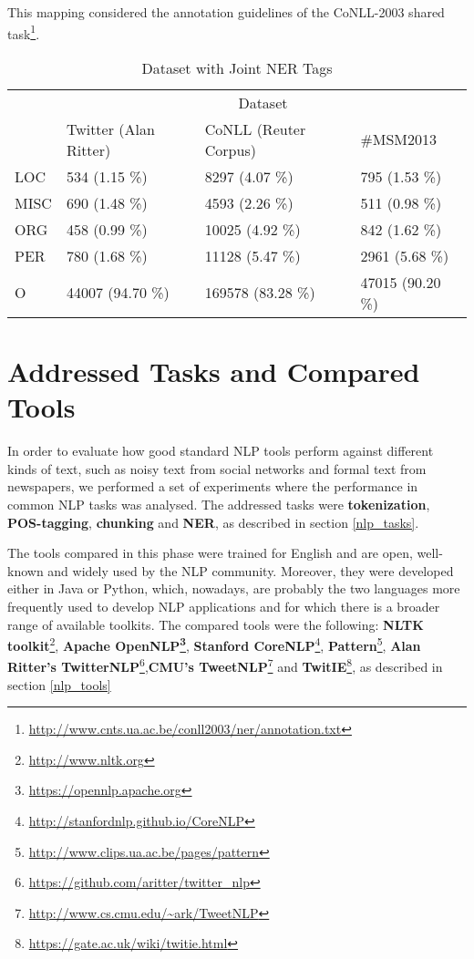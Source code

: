 This mapping considered the annotation guidelines of the CoNLL-2003 shared task\footnote{\url{http://www.cnts.ua.ac.be/conll2003/ner/annotation.txt}}.

\begin{table}[H]
\centering
\footnotesize
\begin{tabular}{|l|l|l|l|}
\hline
\multirow{2}{*}{} & \multicolumn{3}{c|}{Dataset} \\ \cline{2-4} 
 & Twitter (Alan Ritter) & CoNLL (Reuter Corpus) & \#MSM2013 \\ \hline
LOC & 534 (1.15 \%)& 8297 (4.07 \%)& 795 (1.53 \%)\\ \hline
MISC & 690 (1.48 \%)& 4593 (2.26 \%)& 511 (0.98 \%)\\ \hline
ORG & 458 (0.99 \%)& 10025 (4.92 \%)& 842 (1.62 \%)\\ \hline
PER & 780 (1.68 \%)& 11128 (5.47 \%)& 2961 (5.68 \%)\\ \hline
O & 44007 (94.70 \%)& 169578 (83.28 \%)& 47015 (90.20 \%)\\ \hline
\end{tabular}
\caption[Dataset with Joint NER Tags]{Dataset with Joint NER Tags}
\label{tab:data-joint-ner}
\end{table}

\section{Addressed Tasks and Compared Tools}

In order to evaluate how good standard NLP tools perform against different kinds of text, such as noisy text from social networks and formal text from newspapers, we performed a set of experiments where the performance in common NLP tasks was analysed. The addressed tasks were \textbf{tokenization}, \textbf{POS-tagging}, \textbf{chunking} and \textbf{NER}, as described in section \ref{nlp_tasks}. 

The tools compared in this phase were trained for English and are open, well-known and widely used by the NLP community. Moreover, they were developed either in Java or Python, which, nowadays, are probably the two languages more frequently used to develop NLP applications and for which there is a broader range of available toolkits. The compared tools were the following: \textbf{NLTK toolkit}\footnote{\url{http://www.nltk.org}}, \textbf{Apache OpenNLP\footnote{\url{https://opennlp.apache.org}}}, \textbf{Stanford CoreNLP}\footnote{\url{http://stanfordnlp.github.io/CoreNLP}}, \textbf{Pattern}\footnote{\url{http://www.clips.ua.ac.be/pages/pattern}}, \textbf{Alan Ritter's TwitterNLP}\footnote{\url{https://github.com/aritter/twitter_nlp}},\textbf{CMU's TweetNLP}\footnote{\url{http://www.cs.cmu.edu/~ark/TweetNLP}} and \textbf{TwitIE}\footnote{\url{https://gate.ac.uk/wiki/twitie.html}}, as described in section \ref{nlp_tools}

